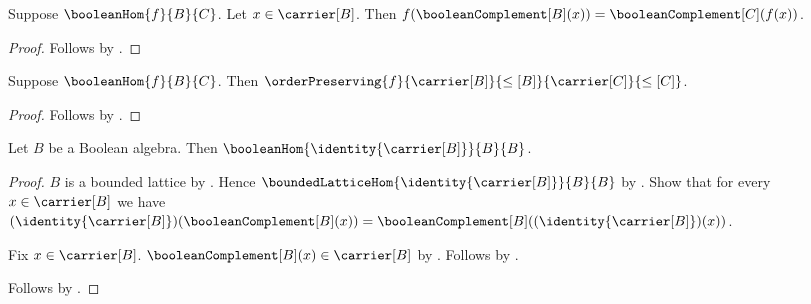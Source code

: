 \begin{proposition}\label{boolean_hom_complement}
    Suppose $\booleanHom{f}{B}{C}$.
    Let $x\in\carrier[B]$.
    Then $f(\booleanComplement[B](x))
        =\booleanComplement[C](f(x))$.
\end{proposition}
\begin{proof}
    Follows by .
\end{proof}

\begin{theorem}\label{boolean_hom_order_preserving}
    Suppose $\booleanHom{f}{B}{C}$.
    Then
        $\orderPreserving
            {f}{\carrier[B]}{\leq[B]}
            {\carrier[C]}{\leq[C]}$.
\end{theorem}
\begin{proof}
    Follows by
        .
\end{proof}

\begin{proposition}\label{identity_boolean_hom}
    Let $B$ be a Boolean algebra.
    Then $\booleanHom{\identity{\carrier[B]}}{B}{B}$.
\end{proposition}
\begin{proof}
    $B$ is a bounded lattice by
        .
    Hence $\boundedLatticeHom{\identity{\carrier[B]}}{B}{B}$ by
        .
    Show that for every $x\in\carrier[B]$ we have
        $(\identity{\carrier[B]})(\booleanComplement[B](x))
            =\booleanComplement[B]
                ((\identity{\carrier[B]})(x))$.
    \begin{subproof}
        Fix $x\in\carrier[B]$.
        $\booleanComplement[B](x)\in\carrier[B]$ by
            .
        Follows by .
    \end{subproof}
    Follows by .
\end{proof}

